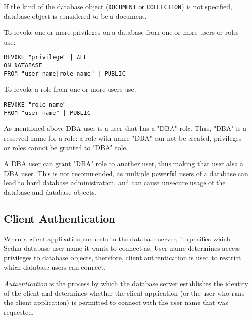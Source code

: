 \documentclass[a4paper,12pt]{article}
\begin{document}
If the kind of the database object (\verb!DOCUMENT! or \verb!COLLECTION!) is not specified, database object is considered to be a document.

To revoke one or more privileges on a database from one or more users or roles use:


\begin{verbatim}
REVOKE "privilege" | ALL
ON DATABASE
FROM "user-name|role-name" | PUBLIC
\end{verbatim}

To revoke a role from one or more users use:


\begin{verbatim}
REVOKE "role-name"
FROM "user-name" | PUBLIC
\end{verbatim}

As mentioned above DBA user is a user that has a "DBA" role. Thus, "DBA" is a reserved name for a role: a role with name "DBA" can not be created, privileges or roles cannot be granted to "DBA" role.

A DBA user can grant "DBA" role to another user, thus making that user also a DBA user. This is not recommended, as multiple powerful users of a database can lead to hard database administration, and can cause unsecure usage of the database and database objects.


\subsection{Client Authentication}

When a client application connects to the database server, it specifies which Sedna database user name it wants to connect as. User name determines access privileges to database objects, therefore, client authentication is used to restrict which database users can connect.

\emph{Authentication} is the process by which the database server establishes the identity of the client and determines whether the client application (or the user who runs the client application) is permitted to connect with the user name that was requested.
\end{document}
